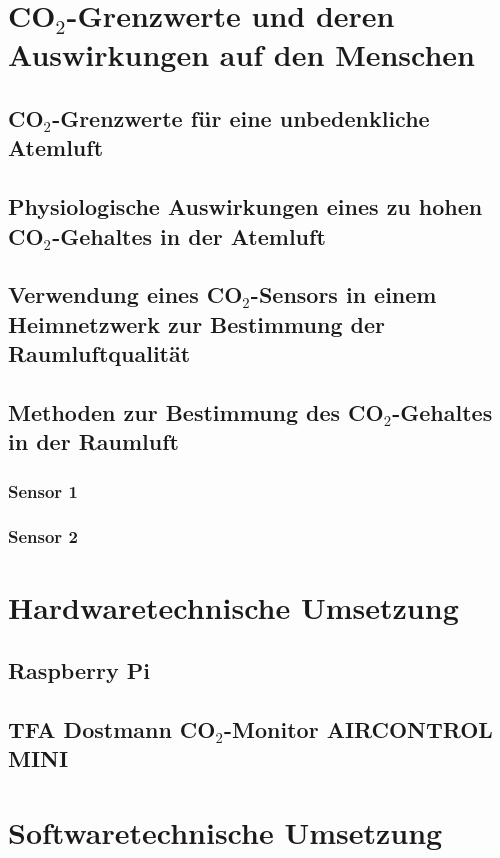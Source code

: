 \documentclass[a4paper,
    11pt,
    headings=small,
    ngerman,
    listof=totoc,
    numbers=noenddot]{scrreprt}[2021/11/13]
\begin{document}
\chapter{CO$_2$-Grenzwerte und deren Auswirkungen auf den Menschen}

\section{CO$_2$-Grenzwerte für eine unbedenkliche Atemluft}

\section{Physiologische Auswirkungen eines zu hohen CO$_2$-Gehaltes in der Atemluft}

\section{Verwendung eines CO$_2$-Sensors in einem Heimnetzwerk zur Bestimmung der Raumluftqualität}

\section{Methoden zur Bestimmung des CO$_2$-Gehaltes in der Raumluft}
\subsection{Sensor 1}
\subsection{Sensor 2}



\chapter{Hardwaretechnische Umsetzung}

\section{Raspberry Pi}

\section{TFA Dostmann CO$_2$-Monitor AIRCONTROL MINI}



\chapter{Softwaretechnische Umsetzung}
\end{document}
